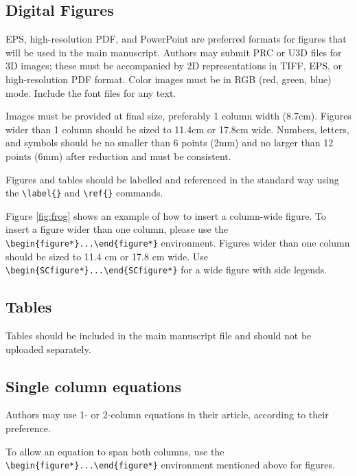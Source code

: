 \documentclass[9pt,twocolumn,twoside,lineno]{pnas-new}
\begin{document}
\subsection*{Digital Figures}

EPS, high-resolution PDF, and PowerPoint are preferred formats for figures that will be used in the main manuscript. Authors may submit PRC or U3D files for 3D images; these must be accompanied by 2D representations in TIFF, EPS, or high-resolution PDF format. Color images must be in RGB (red, green, blue) mode. Include the font files for any text.

Images must be provided at final size, preferably 1 column width (8.7cm). Figures wider than 1 column should be sized to 11.4cm or 17.8cm wide. Numbers, letters, and symbols should be no smaller than 6 points (2mm) and no larger than 12 points (6mm) after reduction and must be consistent. 

Figures and tables should be labelled and referenced in the standard way using the \verb|\label{}| and \verb|\ref{}| commands.

Figure \ref{fig:frog} shows an example of how to insert a column-wide figure. To insert a figure wider than one column, please use the \verb|\begin{figure*}...\end{figure*}| environment. Figures wider than one column should be sized to 11.4 cm or 17.8 cm wide. Use \verb|\begin{SCfigure*}...\end{SCfigure*}| for a wide figure with side legends.

\subsection*{Tables}
Tables should be included in the main manuscript file and should not be uploaded separately.

\subsection*{Single column equations}

Authors may use 1- or 2-column equations in their article, according to their preference.

To allow an equation to span both columns, use the \verb|\begin{figure*}...\end{figure*}| environment mentioned above for figures.
\end{document}
